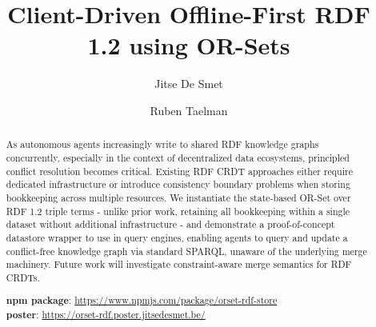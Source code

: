 \documentclass[runningheads]{llncs}
\begin{document}
%

    \title{Client-Driven Offline-First RDF 1.2 using OR-Sets}
%
%
    \author{Jitse De Smet \and
    Ruben Taelman}
%
%
%
    \maketitle              %
%
    \begin{abstract}
        As autonomous agents increasingly write to shared RDF knowledge graphs concurrently,
        especially in the context of decentralized data ecosystems, principled conflict resolution becomes critical.
        Existing RDF CRDT approaches either require dedicated infrastructure or introduce
        consistency boundary problems when storing bookkeeping across multiple resources.
        We instantiate the state-based OR-Set over RDF 1.2 triple terms -
        unlike prior work, retaining all bookkeeping within a single dataset without additional infrastructure -
        and demonstrate a proof-of-concept datastore wrapper to use in query engines,
        enabling agents to query and update a conflict-free knowledge graph via standard SPARQL,
        unaware of the underlying merge machinery.
        Future work will investigate constraint-aware merge semantics for RDF CRDTs.



        \textbf{npm package}: \href{https://www.npmjs.com/package/orset-rdf-store}{https://www.npmjs.com/package/orset-rdf-store} \\
        \textbf{poster}: \href{https://orset-rdf.poster.jitsedesmet.be/}{https://orset-rdf.poster.jitsedesmet.be/}
    \end{abstract}
%
%
%
\end{document}
